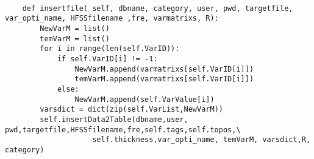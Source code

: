 \newpage

\setcounter{section}{0}
\renewcommand{\myappendixname}{数据库系统存储数据代码1}
\dnabstract
\begin{verbatim}

    def insertfile( self, dbname, category, user, pwd, targetfile, var_opti_name, HFSSfilename ,fre, varmatrixs, R):    
        NewVarM = list()
        temVarM = list()
        for i in range(len(self.VarID)):
            if self.VarID[i] != -1:
                NewVarM.append(varmatrixs[self.VarID[i]])
                temVarM.append(varmatrixs[self.VarID[i]])
            else:
                NewVarM.append(self.VarValue[i])
        varsdict = dict(zip(self.VarList,NewVarM))
        self.insertData2Table(dbname,user, pwd,targetfile,HFSSfilename,fre,self.tags,self.topos,\
                    self.thickness,var_opti_name, temVarM, varsdict,R, category)   
         \end{verbatim}
\renewcommand{\myappendixname}{数据库系统存储数据代码2}
\dnabstract   